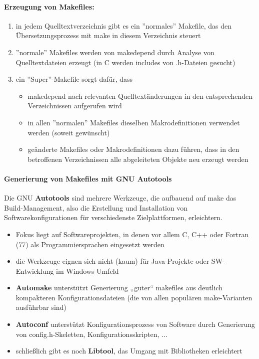 \paragraph{Erzeugung von Makefiles:}
\begin{enumerate}
	\item in jedem Quelltextverzeichnis gibt es ein ''normales'' Makefile, das den Übersetzungsprozess mit make in diesem Verzeichnis steuert
	\item ''normale'' Makefiles werden von makedepend durch Analyse von Quelltextdateien erzeugt (in C werden includes von .h-Dateien gesucht)
	\item ein ''Super''-Makefile sorgt dafür, dass 
	\begin{itemize}
		\item makedepend nach relevanten Quelltextänderungen in den entsprechenden Verzeichnissen aufgerufen wird
		\item in allen ''normalen'' Makefiles dieselben Makrodefinitionen verwendet werden (soweit gewünscht)
		\item geänderte Makefiles oder Makrodefinitionen dazu führen, dass in den betroffenen Verzeichnissen alle abgeleiteten Objekte neu erzeugt werden
	\end{itemize}
\end{enumerate}

\paragraph{Generierung von Makefiles mit GNU Autotools}
Die GNU \textbf{Autotools} sind mehrere Werkzeuge, die aufbauend auf make das Build-Management, also die Erstellung und Installation von Softwarekonfigurationen für verschiedenste Zielplattformen, erleichtern. 
\begin{itemize}
	\item Fokus liegt auf Softwareprojekten, in denen vor allem C, C++ oder Fortran (77) als Programmiersprachen eingesetzt werden
	\item die Werkzeuge eignen sich nicht (kaum) für Java-Projekte oder SW-Entwicklung im Windows-Umfeld
	\item \textbf{Automake} unterstützt Generierung „guter“ makefiles aus deutlich kompakteren Konfigurationsdateien (die von allen populären make-Varianten ausführbar sind)
	\item \textbf{Autoconf} unterstützt Konfigurationsprozess von Software durch Generierung von config.h-Skeletten, Konfigurationsskripten, ...  
	\item schließlich gibt es noch \textbf{Libtool}, das Umgang mit Bibliotheken erleichtert
\end{itemize}
